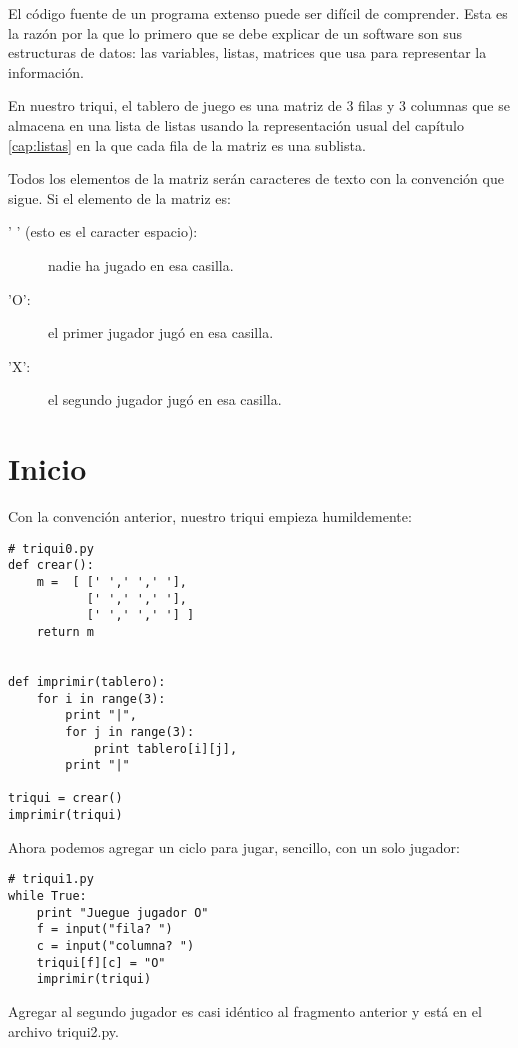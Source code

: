 El código fuente de un programa extenso puede ser difícil de comprender. Esta es
la razón por la que lo primero que se debe explicar de un software son sus 
estructuras de datos: las variables, listas, matrices que usa para representar
la información. 

En nuestro triqui, el tablero de juego es una matriz de 3 filas y 3 columnas que
se almacena en una lista de listas usando la representación usual del capítulo 
\ref{cap:listas} en la que cada fila de la matriz es una sublista.

Todos los elementos de la matriz serán caracteres de texto con la 
convención que sigue. Si el elemento de la matriz es:

\begin{description}
  \item[' ' (esto es el caracter espacio):]   nadie ha jugado en esa casilla.
  \item['O': ] el primer jugador jugó en esa casilla.
  \item['X':] el segundo jugador jugó en esa casilla.
\end{description}

\section{Inicio}

Con la convención anterior, nuestro triqui empieza humildemente:

\beforeverb
\begin{verbatim}
# triqui0.py
def crear():
    m =  [ [' ',' ',' '],
           [' ',' ',' '],
           [' ',' ',' '] ]
    return m


def imprimir(tablero):
    for i in range(3):
        print "|",
        for j in range(3):
            print tablero[i][j],
        print "|"
        
triqui = crear()
imprimir(triqui)
\end{verbatim}
\afterverb

Ahora podemos agregar un ciclo para jugar, sencillo, con un solo jugador:

\beforeverb
\begin{verbatim}
# triqui1.py
while True:
    print "Juegue jugador O"
    f = input("fila? ")
    c = input("columna? ")
    triqui[f][c] = "O"
    imprimir(triqui)
\end{verbatim}
\afterverb

Agregar al segundo jugador es casi idéntico al fragmento anterior y  está en el 
archivo triqui2.py. 

